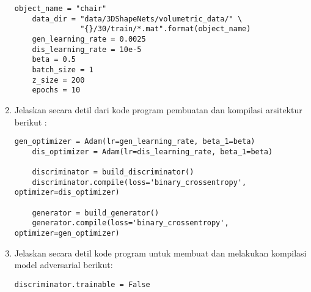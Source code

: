 \begin{enumerate}
\begin{lstlisting}[caption=Setting Parameter,label={lst:8.2}]
    object_name = "chair"
    data_dir = "data/3DShapeNets/volumetric_data/" \
               "{}/30/train/*.mat".format(object_name)
    gen_learning_rate = 0.0025
    dis_learning_rate = 10e-5
    beta = 0.5
    batch_size = 1
    z_size = 200
    epochs = 10
\end{lstlisting}
\item
Jelaskan secara detil dari kode program pembuatan dan kompilasi arsitektur berikut :
\begin{lstlisting}[caption=Setting Parameter,label={lst:8.2}]
    gen_optimizer = Adam(lr=gen_learning_rate, beta_1=beta)
    dis_optimizer = Adam(lr=dis_learning_rate, beta_1=beta)

    discriminator = build_discriminator()
    discriminator.compile(loss='binary_crossentropy', optimizer=dis_optimizer)

    generator = build_generator()
    generator.compile(loss='binary_crossentropy', optimizer=gen_optimizer)
\end{lstlisting}
\item
Jelaskan secara detil kode program untuk membuat dan melakukan kompilasi model adversarial berikut:
\begin{lstlisting}[caption=Membuat dan Kompilasi Model Adversarial,label={lst:8.3}]
    discriminator.trainable = False


\end{lstlisting}
\end{enumerate}
